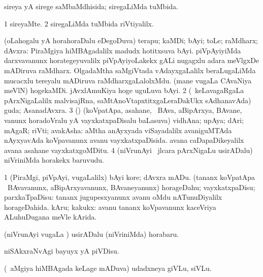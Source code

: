 \bentry
{} 
\gl{\gu}
\expl{}
\bmng
 sireya yA sirege saMbaMdhisida; siregaLiMda tuMbida. 
\emng
\eentry

\bentry
{} 
\gl{\kirxvi}
\expl{}
\bmng
\bnum
\num{1} sireyaMte. 
\num{2} siregaLiMda tuMbida riVtiyalilx. 
\enum
\emng
\eentry

\bentry
{} 
\gl{\nA}
\expl{}
\bmng
\bnum
{} (oLahogalu yA horahoraDalu eDegoDuva) terapu; kaMDi; bAyi; toLe; raMdharx; dAvxra: 
\banum
{} PiraMgiya hiMBAgadalilx madudx hotitxsuva bAyi. 
 piVpAyiyiMda darxvavanunx horategeyuvalilx piVpAyiyoLakekx gALi nugagxlu adara meVlgxDe mADiruva raMdharx. 
 OlgadaMtha saMgiVtada vAdayxgaLalilx beraLugaLiMda mucacxlu tereyalu mADiruva raMdharxgaLalolxMdu. 
 (mane \mo vugaLa CAvaNiya meVlN) hogekaMDi. 
 jAvxlAmuKiya hoge uguLuva bAyi. 
\eanum
\numie
\num{2} (\kanmu\ keLavagaRgaLa pArxNigaLalilx malvisajRna, saMtAnoVtapxtitxgaLeraDakUkx sAdhanavAda) guda; AsanadAvxra. 
\num{3} (\rUpa) (koVpatApa, asahane, \mo\ BAva, aBipArxya, BAvane, \mo vanunx horadoVralu yA vayxkatxpaDisalu baLasuva) vidhAna; upAya; dAri; mAgaR; riVti; avakAsha:  aMtha anAyxyada viSayadalilx avaniguMTAda nAyxyavAda koVpavanunx avanu vayxkatxpaDisida.  avana caDapaDikeyalilx avana asahane vayxkatxgoMDitu. 
\num{4} (niVrunAyi \mo\ jlcara pArxNigaLu usirADalu) niVriniMda horakekx baruvudu. 
\enum
\emng
\eentry

\bentry
{} 
\gl{\sakirx}
\expl{}
\bmng
\bnum
\num{1} (PiraMgi, piVpAyi, \mo vugaLalilx) bAyi kore; dAvxra mADu. 
 (tananx koVpatApa \mo\ BAvavanunx, aBipArxyavanunx, BAvaneyanunx) 
\banum
{} horageDahu; vayxkatxpaDisu; parxkaTpaDisu:  tananx jugupesxyanunx avanu oMdu nATunuDiyalilx horageDahida. 
 kAru; kakukx:  avanu tananx koVpavanunx kaceVriya ALuhuDugana meVle kArida. 
\eanum
\numie
\enum
\emng

\noindent 
\gl{\akirx}
\expl{}
\bmng
 (niVrunAyi \mo vugaLa \vi) usirADalu (niVriniMda) horabaru. 
\emng

\noindent 
\gl{\pagu}
\expl{}
\bmng
  niSAkxraNvAgi bayuyx yA piVDisu. 
\emng
\eentry

\bentry
{} 
\gl{\nA}
\expl{}
\bmng
 (\kanmu\ aMgiya hiMBAgada keLage mADuva) udadxneya giVLu, siVLu. 
\emng
\eentry

